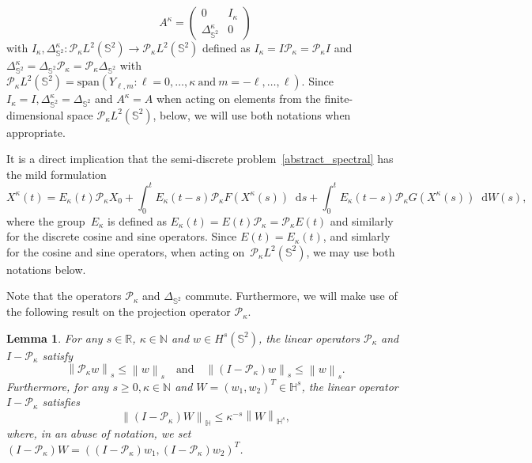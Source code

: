\documentclass[a4paper]{amsart}
\newtheorem{lem}[thm]{Lemma}
\theoremstyle{remark}
\theoremstyle{definition}
\newcommand{\HH}{\mathbb{H}}
\newcommand{\IS}{\mathbb{S}}
\newcommand*\dd{\mathop{}\!\mathrm{d}}
\begin{document}
$$
A^\kappa=\begin{pmatrix}
0& I_\kappa\\ \Delta^\kappa_{\mathbb{S}^2}&0\end{pmatrix}
$$
with $I_\kappa,\Delta^\kappa_{\IS^2}\colon\mathcal{P}_\kappa L^2(\IS^2) \to\mathcal{P}_\kappa L^2(\IS^2)$ 
defined as $I_\kappa=I\mathcal{P}_\kappa=\mathcal{P}_\kappa I$ and 
$\Delta^\kappa_{\IS^2}=\Delta_{\IS^2}\mathcal{P}_\kappa=\mathcal{P}_\kappa \Delta_{\IS^2}$ with $\mathcal{P}_\kappa L^2(\IS^2) = \text{span}(Y_{\ell,m}:\ell=0,\ldots,\kappa\:\text{and}\: m=-\ell,\ldots,\ell)$. 
Since $I_\kappa=I, \Delta^\kappa_{\IS^2}=\Delta_{\IS^2}$ and $A^\kappa=A$ when acting on elements from the finite-dimensional space $\mathcal{P}_\kappa L^2(\IS^2)$, below, we will use both notations when appropriate.

It is a direct implication that the semi-discrete problem~\eqref{abstract_spectral} has the mild formulation 
\begin{equation}
\label{mild_trunc}
X^\kappa(t)=E_\kappa(t)\mathcal{P}_\kappa X_0+\int_{0}^{t} E_\kappa(t-s)\mathcal{P}_\kappa F(X^\kappa(s))\dd s
+\int_{0}^{t} E_\kappa(t-s)\mathcal{P}_\kappa G(X^\kappa(s))\dd W(s), 
\end{equation}
where the group~$E_\kappa$ is defined as $E_\kappa(t)=E(t)\mathcal{P}_\kappa=\mathcal{P}_\kappa E(t)$ and similarly for the discrete cosine and sine operators. Since $E(t)=E_\kappa(t)$, and simlarly for the cosine and sine operators, when acting on~$\mathcal{P}_\kappa L^2(\IS^2)$, we may use both notations below. 

Note that the operators $\mathcal{P}_\kappa$ and $\Delta_{\mathbb{S}^2}$ commute. Furthermore, we will make use of the following result on the projection operator $\mathcal{P}_\kappa$.
\begin{lem}
\label{lem_p}
For any $s\in\mathbb{R}$, $\kappa\in\mathbb{N}$ and $w\in H^s(\mathbb{S}^2)$, the linear operators $\mathcal{P}_\kappa$ and $I-\mathcal{P}_\kappa$ satisfy
\begin{equation}
\label{lem_p1}
\left\|\mathcal{P}_\kappa w\right\|_{s}\le \left\| w\right\|_{s} \quad  \text{and} \quad
\left\|\left(I-\mathcal{P}_\kappa \right)w\right\|_{s}\le \left\| w\right\|_{s}.
\end{equation}
Furthermore, for any $s\ge 0, \kappa\in\mathbb{N}$ and  $W=(w_1,w_2)^T \in {\HH}^{s}$, the linear operator $I-\mathcal{P}_\kappa$ satisfies
\begin{equation}
\label{lem_p2}
\left\|(I-\mathcal{P}_\kappa)W\right\|_{\HH}\le \kappa^{-s}\left\|W\right\|_{{\HH}^s},
\end{equation}
where, in an abuse of notation, we set $\left(I-\mathcal{P}_\kappa\right)W=\left(\left(I-\mathcal{P}_\kappa\right)w_1,\left(I-\mathcal{P}_\kappa\right)w_2\right)^T$.
\end{lem}
\end{document}
